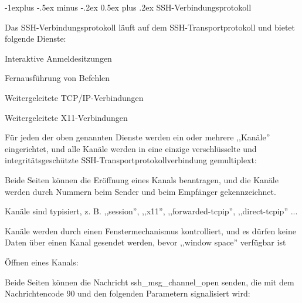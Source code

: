 \documentclass[a4paper]{article}
\makeatletter
\renewcommand{\subsection}{\@startsection{subsection}{2}{0mm}%
 {-1explus -.5ex minus -.2ex}%
 {0.5ex plus .2ex}%
 {\normalfont\normalsize\bfseries}}
\makeatother
\begin{document}
\begin{multicols}{3}
\begin{itemize*}
            \subsection{SSH-Verbindungsprotokoll}
            \begin{itemize*}
                  \item Das SSH-Verbindungsprotokoll läuft auf dem SSH-Transportprotokoll und
                  bietet folgende Dienste:
                  \begin{itemize*}
                        \item Interaktive Anmeldesitzungen
                        \item Fernausführung von Befehlen
                        \item Weitergeleitete TCP/IP-Verbindungen
                        \item Weitergeleitete X11-Verbindungen
                  \end{itemize*}
                  \item Für jeden der oben genannten Dienste werden ein oder mehrere
                  ,,Kanäle'' eingerichtet, und alle Kanäle werden in eine einzige
                  verschlüsselte und integritätsgeschützte
                  SSH-Transportprotokollverbindung gemultiplext:
                  \begin{itemize*}
                        \item Beide Seiten können die Eröffnung eines Kanals beantragen, und die Kanäle werden durch Nummern beim Sender und beim Empfänger gekennzeichnet.
                        \item Kanäle sind typisiert, z. B. ,,session'', ,,x11'', ,,forwarded-tcpip'', ,,direct-tcpip'' ...
                        \item Kanäle werden durch einen Fenstermechanismus kontrolliert, und es dürfen keine Daten über einen Kanal gesendet werden, bevor ,,window space'' verfügbar ist
                  \end{itemize*}
                  \item Öffnen eines Kanals:
                  \begin{itemize*}
                        \item Beide Seiten können die Nachricht ssh\_msg\_channel\_open senden, die mit dem Nachrichtencode 90 und den folgenden Parametern signalisiert wird:

\end{itemize*}
\end{itemize*}
\end{itemize*}
\end{multicols}
\end{document}
